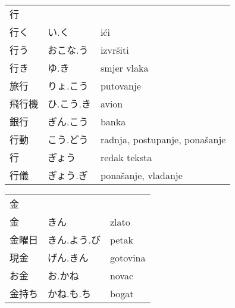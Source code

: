 

\newenvironment{dictentry}[1]{
	\begin{tabular}{p{2cm} p{3cm} p{10cm}}
		#1 &&\\
}{
	\end{tabular}
	\vspace{20pt}
}

\newcommand{\example}[3]{
	\hspace*{\fill}#1 & #2 & #3\\
}

\author{ロボット君}


\begin{dictentry}{行}
\example{行く}{い.く}{ići}
\example{行う}{おこな.う}{izvršiti}
\example{行き}{ゆ.き}{smjer vlaka}
\example{旅行}{りょ.こう}{putovanje}
\example{飛行機}{ひ.こう.き}{avion}
\example{銀行}{ぎん.こう}{banka}
\example{行動}{こう.どう}{radnja, postupanje, ponašanje}
\example{行}{ぎょう}{redak teksta}
\example{行儀}{ぎょう.ぎ}{ponašanje, vladanje}
\end{dictentry}

\begin{dictentry}{金}
\example{金}{きん}{zlato}
\example{金曜日}{きん.よう.び}{petak}
\example{現金}{げん.きん}{gotovina}
\example{お金}{お.かね}{novac}
\example{金持ち}{かね.も.ち}{bogat}
\end{dictentry}


